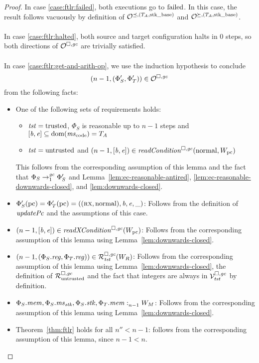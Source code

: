 \begin{proof}
  In case \ref{case:ftlr:failed}, both executions go to $\failed$.
  In this case, the result follows vacuously by definition of $\lrol$ and $\lror$.
  \\\\
  In case \ref{case:ftlr:halted}, both source and target configuration halts in 0
  steps, so both directions of $\lro$ are trivially satisfied.
  \\\\
  In case \ref{case:ftlr:get-and-arith-op}, we use the induction hypothesis to conclude
  \[
    \npair[n-1]{(\Phi_S',\Phi_T')} \in \lro
  \]
  from the following facts:
  \begin{itemize}
  \item One of the following sets of requirements holds:
    \begin{itemize}
    \item $\trust = \trusted$, $\Phi_S$ is reasonable up to $n-1$ steps and $[\baddr,\eaddr] \subseteq \dom(\mscode) = \ta$
    \item $\trust = \untrusted$ and $\npair[n-1]{[\baddr,\eaddr]} \in \readCond{\normal,W_\pcreg}$
    \end{itemize}
    This follows from the corresponding assumption of this lemma and the fact that $\Phi_S \nstep[1]{\gc} \Phi_S'$ and Lemma~\ref{lem:ec-reasonable-antired}, \ref{lem:ec-reasonable-downwards-closed}, and \ref{lem:downwards-closed}.
  \item $\Phi_S'(\pcreg) = \Phi_T'(\pcreg) = ((\rx,\normal),\baddr,\eaddr,\_)$:
    Follows from the definition of $\updPcAddr{}$ and the assumptions of this case.
  \item $\npair[n-1]{[\baddr,\eaddr]} \in \xReadCond{W_\pcreg}$:
    Follows from the corresponding assumption of this lemma using Lemma~\ref{lem:downwards-closed}.
  \item $\npair[n-1]{(\Phi_S.\reg,\Phi_T.\reg)} \in \lrrg{\trust}(W_R)$:
    Follows from the corresponding assumption of this lemma using Lemma~\ref{lem:downwards-closed}, the definition of $\lrr$ and the fact that integers are always in $\lrvg{\trust}$ by definition.
  \item $\memSat[n-1]{\Phi_S.\mem,\Phi_S.\ms_\stk,\Phi_S.\stk,\Phi_T.\mem}{W_M}$:
    Follows from the corresponding assumption of this lemma using Lemma~\ref{lem:downwards-closed}.
  \item Theorem~\ref{thm:ftlr} holds for all $n'' < n-1$:
    follows from the corresponding assumption of this lemma, since $n - 1 < n$.
  \end{itemize}


\end{proof}
